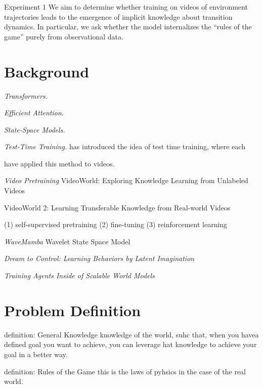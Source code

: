 




\begin{CustomBox}{Experiment 1}
We aim to determine whether training on videos of environment trajectories leads to the emergence of implicit knowledge about transition dynamics. In particular, we ask whether the model internalizes the “rules of the game” purely from observational data.
\end{CustomBox}


\section{Background}
\textit{Transformers.}

\textit{Efficient Attention.} 

\textit{State-Space Models.}


\textit{Test-Time Training.} \citet{sun2025learninglearntesttime} has introduced the idea of test time training, where each 

\citet{dalal2025oneminutevideogenerationtesttime} have applied this method to videos. 


\textit{Video Pretraining}
VideoWorld: Exploring Knowledge Learning from Unlabeled Videos \citep{ren2025videoworldexploringknowledgelearning}

VideoWorld 2: Learning Transferable Knowledge from Real-world Videos \citep{ren2026videoworld2learningtransferable}

(1) self-supervised pretraining
(2) fine-tuning
(3) reinforcement learning

\textit{WaveMamba}
Wavelet State Space Model

\textit{Dream to Control: Learning Behaviors by Latent Imagination} \citep{hafner2020dreamcontrollearningbehaviors}

\textit{Training Agents Inside of Scalable World Models} \citep{hafner2025trainingagentsinsidescalable}

\section{Problem Definition}

definition: General Knowledge
knowledge of the world, suhc that, when you havea defined goal you want to achieve, you can leverage hat knowledge to achieve your goal in a better way. 

definition: Rules of the Game
this is the laws of pyhsics in the case of the real world. 

